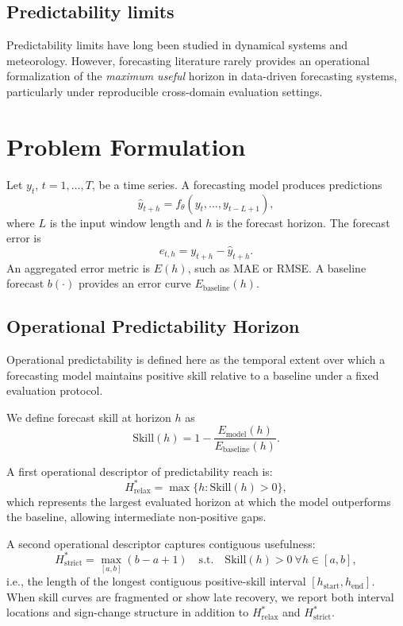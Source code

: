\documentclass[11pt]{article}
\begin{document}
\subsection{Predictability limits}
Predictability limits have long been studied in dynamical systems and meteorology. However, forecasting literature rarely provides an operational formalization of the \emph{maximum useful} horizon in data-driven forecasting systems, particularly under reproducible cross-domain evaluation settings.

\section{Problem Formulation}
Let $y_t$, $t = 1,\dots,T$, be a time series.
A forecasting model produces predictions
\begin{equation}
\hat{y}_{t+h} = f_{\theta}(y_t, \dots, y_{t-L+1}),
\end{equation}
where $L$ is the input window length and $h$ is the forecast horizon.
The forecast error is
\begin{equation}
 e_{t,h} = y_{t+h} - \hat{y}_{t+h}.
\end{equation}
An aggregated error metric is $E(h)$, such as MAE or RMSE.
A baseline forecast $b(\cdot)$ provides an error curve $E_{\mathrm{baseline}}(h)$.

\subsection{Operational Predictability Horizon}
Operational predictability is defined here as the temporal extent over which a forecasting model maintains positive skill relative to a baseline under a fixed evaluation protocol.

We define forecast skill at horizon $h$ as
\begin{equation}
\mathrm{Skill}(h) = 1 - \frac{E_{\mathrm{model}}(h)}{E_{\mathrm{baseline}}(h)}.
\end{equation}

A first operational descriptor of predictability reach is:
\begin{equation}
H^*_{\mathrm{relax}} = \max\{h : \mathrm{Skill}(h) > 0\},
\end{equation}
which represents the largest evaluated horizon at which the model outperforms the baseline, allowing intermediate non-positive gaps.

A second operational descriptor captures contiguous usefulness:
\begin{equation}
H^*_{\mathrm{strict}} = \max_{[a,b]}(b-a+1)
\quad \text{s.t.} \quad \mathrm{Skill}(h)>0\ \forall h\in[a,b],
\end{equation}
i.e., the length of the longest contiguous positive-skill interval $[h_{\mathrm{start}},h_{\mathrm{end}}]$.
When skill curves are fragmented or show late recovery, we report both interval locations and sign-change structure in addition to $H^*_{\mathrm{relax}}$ and $H^*_{\mathrm{strict}}$.
\end{document}
